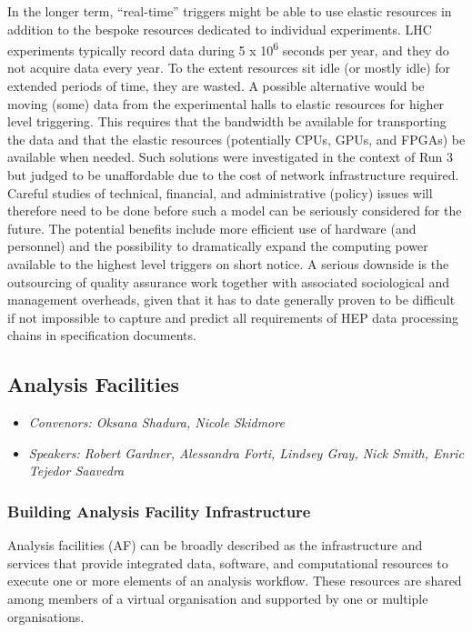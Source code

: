 \documentclass[a4paper,11pt]{article}
\begin{document}
In the longer term, ``real-time'' triggers might be able to use elastic
resources in addition to the bespoke resources dedicated to individual
experiments. LHC experiments typically record data during 5 x
10\textsuperscript{6} seconds per year, and they do not acquire data
every year. To the extent resources sit idle (or mostly idle) for
extended periods of time, they are wasted. A possible alternative would
be moving (some) data from the experimental halls to elastic resources
for higher level triggering. This requires that the bandwidth be
available for transporting the data and that the elastic resources
(potentially CPUs, GPUs, and FPGAs) be available when needed. Such
solutions were investigated in the context of Run 3 but judged to be
unaffordable due to the cost of network infrastructure required. Careful
studies of technical, financial, and administrative (policy) issues will
therefore need to be done before such a model can be seriously
considered for the future. The potential benefits include more efficient
use of hardware (and personnel) and the possibility to dramatically
expand the computing power available to the highest level triggers on
short notice. A serious downside is the outsourcing of quality assurance
work together with associated sociological and management overheads,
given that it has to date generally proven to be difficult if not
impossible to capture and predict all requirements of HEP data processing
chains in specification documents.

\hypertarget{analysis-facilities}{%
\subsection{Analysis Facilities}\label{analysis-facilities}}

\begin{itemize}
    \item \emph{Convenors: Oksana Shadura, Nicole Skidmore}
    \item \emph{Speakers: Robert Gardner, Alessandra Forti, Lindsey Gray, Nick Smith, Enric Tejedor Saavedra}
\end{itemize}

\hypertarget{building-analysis-facility-infrastructure}{%
\subsubsection{Building Analysis Facility
Infrastructure}\label{building-analysis-facility-infrastructure}}

Analysis facilities (AF) can be broadly described as the infrastructure
and services that provide integrated data, software, and computational
resources to execute one or more elements of an analysis workflow. These
resources are shared among members of a virtual organisation and
supported by one or multiple organisations.
\end{document}
